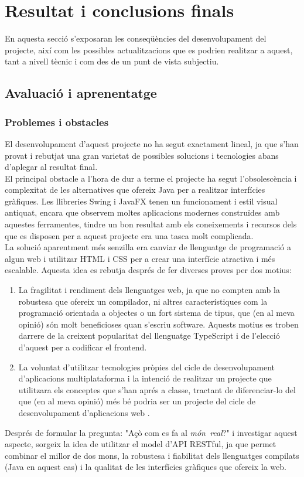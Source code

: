 \chapter{Resultat i conclusions finals}
En aquesta secció s'exposaran les conseqüències del desenvolupament del projecte, així com les possibles actualitzacions que es podrien realitzar a aquest, tant a nivell tècnic i com des de un punt de vista subjectiu.
\section{Avaluació i aprenentatge}
\subsection{Problemes i obstacles}
El desenvolupament d'aquest projecte no ha segut exactament lineal, ja que s'han provat i rebutjat una gran varietat de possibles solucions i tecnologies abans d'aplegar al resultat final.
\\[3mm]
El principal obstacle a l'hora de dur a terme el projecte ha segut l'obsolescència i complexitat de les alternatives que ofereix Java per a realitzar interfícies gràfiques. Les llibreries Swing i JavaFX tenen un funcionament i estil visual antiquat, encara que observem moltes aplicacions modernes construïdes amb aquestes ferramentes, tindre un bon resultat amb els coneixements i recursos dels que es disposen per a aquest projecte era una tasca molt complicada.
\\[3mm]
La solució aparentment més senzilla era canviar de llenguatge de programació a algun web i utilitzar HTML i CSS per a crear una interfície atractiva i més escalable. Aquesta idea es rebutja després de fer diverses proves per dos motius:
\begin{enumerate}
    \item La fragilitat i rendiment dels llenguatges web, ja que no compten amb la robustesa que ofereix un compilador, ni altres característiques com la programació orientada a objectes o un fort sistema de tipus, que (en al meva opinió) són molt beneficioses quan s'escriu software. Aquests motius es troben darrere de la creixent popularitat del llenguatge TypeScript i de l'elecció d'aquest per a codificar el frontend.
    \item La voluntat d'utilitzar tecnologies pròpies del cicle de desenvolupament d’aplicacions multiplataforma i la intenció de realitzar un projecte que utilitzara els conceptes que s'han aprés a classe, tractant de diferenciar-lo del que (en al meva opinió) més bé podria ser un projecte del cicle de desenvolupament d’aplicacions web .
\end{enumerate}
Després de formular la pregunta: "Açò com es fa al \textit{món\ real}?" i investigar aquest aspecte, sorgeix la idea de utilitzar el model d'API RESTful, ja que permet combinar el millor de dos mons, la robustesa i fiabilitat dels llenguatges compilats (Java en aquest cas) i la qualitat de les interfícies gràfiques que ofereix la web.
